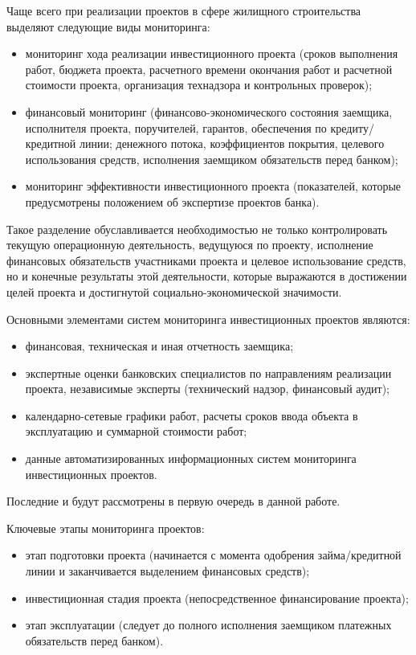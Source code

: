 \documentclass[12pt,a4paper]{article} %
\begin{document}
Чаще всего при реализации проектов в сфере жилищного строительства выделяют следующие виды мониторинга:
\begin{itemize}
	\item мониторинг хода реализации инвестиционного проекта (сроков выполнения работ, бюджета проекта, расчетного времени окончания работ и расчетной стоимости проекта, организация технадзора и контрольных проверок);
	\item финансовый мониторинг (финансово-экономического состояния заемщика, исполнителя проекта, поручителей, гарантов, обеспечения по кредиту/кредитной линии; денежного потока, коэффициентов покрытия, целевого использования средств, исполнения заемщиком обязательств перед банком);
	\item мониторинг эффективности инвестиционного проекта (показателей, которые предусмотрены положением об экспертизе проектов банка).
\end{itemize}

Такое разделение обуславливается необходимостью не только контролировать текущую операционную деятельность, ведущуюся по проекту, исполнение финансовых обязательств участниками проекта и целевое использование средств, но и конечные результаты этой деятельности, которые выражаются в достижении целей проекта и достигнутой социально-экономической значимости.

Основными элементами систем мониторинга инвестиционных проектов являются:
\begin{itemize}
	\item финансовая, техническая и иная отчетность заемщика;
	\item экспертные оценки банковских специалистов по направлениям реализации проекта, независимые эксперты (технический надзор, финансовый аудит);
	\item календарно-сетевые графики работ, расчеты сроков ввода объекта в эксплуатацию и суммарной стоимости работ;
	\item данные автоматизированных информационных систем мониторинга инвестиционных проектов.
\end{itemize}

Последние и будут рассмотрены в первую очередь в данной работе.

Ключевые этапы мониторинга проектов:
\begin{itemize}
	\item этап подготовки проекта (начинается с момента одобрения займа/кредитной линии и заканчивается выделением финансовых средств);
	\item инвестиционная стадия проекта (непосредственное финансирование проекта);
	\item этап эксплуатации (следует до полного исполнения заемщиком платежных обязательств перед банком).
\end{itemize}
\end{document}
